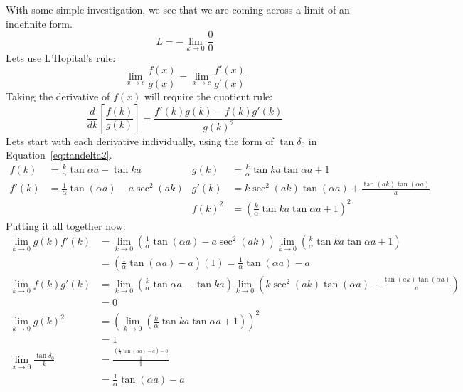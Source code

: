 \documentclass{jhwhw}
\begin{document}
With some simple investigation, we see that we are coming across a limit of an indefinite form.
\begin{equation}
    L = -\lim_{k \to 0} \frac{0}{0}
\end{equation}  
Lets use L'Hopital's rule:
\begin{equation}
    \mathop {\lim }\limits_{x \to c} \frac{{f\left( x \right)}}{{g\left( x \right)}} = \mathop {\lim }\limits_{x \to c} \frac{{f'\left( x \right)}}{{g'\left( x \right)}}
\end{equation}
Taking the derivative of $f(x)$ will require the quotient rule:
\begin{equation}
    \frac{d}{dk}\left[\frac{f(k)}{g(k)}\right]=\frac{   f'(k)g(k) - f(k)g'(k)    }{g(k)^2}
\end{equation}
Lets start with each derivative individually, using the form of $\tan{\delta_0}$ in Equation~\eqref{eq:tandelta2}.
\begin{align}
    f(k) &= \frac{k}{\alpha} \tan{\alpha a} - \tan{k a} & g(k) &= \frac{k}{\alpha} \tan{k a}\tan{\alpha a} + 1  \\ 
    f'(k) &= \frac{1}{\alpha}\tan{(\alpha a)} - a \sec^{2}{(a k)} & g'(k) &=  k \sec^{2}{(a k)}\tan{(\alpha a)}+\frac{\tan{(a k)}\tan{(\alpha a)}}{a} \\
    & & f(k)^2 &= \left( \frac{k}{\alpha} \tan{k a}\tan{\alpha a} + 1 \right)^2
\end{align}
Putting it all together now:
\begin{align}
    \lim_{k \to 0}g(k)f'(k) &= \lim_{k \to 0}\left( \frac{1}{\alpha}\tan{(\alpha a)} - a \sec^{2}{(a k)} \right) \lim_{k \to 0}\left( \frac{k}{\alpha} \tan{k a}\tan{\alpha a} + 1 \right) \\
    &= \left( \frac{1}{\alpha}\tan{(\alpha a)} - a \right)(1) = \frac{1}{\alpha}\tan{(\alpha a)} - a\\
    \lim_{k \to 0}f(k)g'(k) &= \lim_{k \to 0} \left( \frac{k}{\alpha} \tan{\alpha a} - \tan{k a} \right) \lim_{k \to 0} \left( k \sec^{2}{(a k)}\tan{(\alpha a)}+\frac{\tan{(a k)}\tan{(\alpha a)}}{a} \right)\\
    &= 0 \\
    \lim_{k \to 0}g(k)^2  &= \left(\lim_{k \to 0} \left( \frac{k}{\alpha} \tan{k a}\tan{\alpha a} + 1 \right) \right)^2 \\
    & = 1 \\
    \lim_{x \to 0} \frac{\tan{\delta_0}}{k} &= \frac {\frac{\left(\frac{1}{\alpha}\tan{(\alpha a)} - a\right) - 0} {1}}{1} \\
    &= \frac{1}{\alpha}\tan{(\alpha a)} - a
\end{align}
\end{document}
